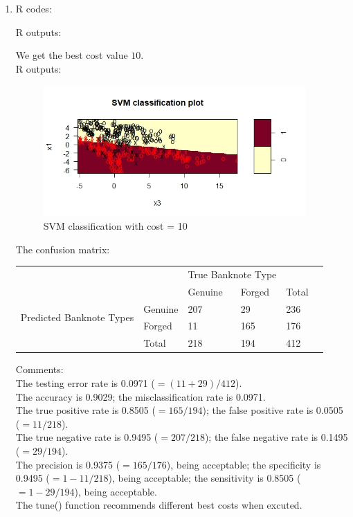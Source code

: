 \documentclass[10pt]{article}
\begin{document}
\begin{enumerate}[1)]
\item
R codes:

R outputs:

We get the best cost value $10$.\\
R outputs:
\begin{figure}[H]
  \centering
  \includegraphics[width=10cm,height=5cm]{p42a.jpeg}
  \caption{SVM classification with cost = 10}
\end{figure}

\vspace{3mm}
The confusion matrix:\\
\begin{tabular}{llllll}
                                          &         & \multicolumn{2}{l}{True Banknote Type} &       &  \\
                                          &         & Genuine           & Forged             & Total &  \\
\multirow{2}{*}{Predicted Banknote Types} & Genuine & 207               & 29                 & 236   &  \\
                                          & Forged  & 11                & 165                & 176   &  \\
                                          & Total   & 218               & 194                & 412   &
\end{tabular}
\vspace{3mm}

Comments:\\
The testing error rate is 0.0971 ($=(11+29)/412$).\\
The accuracy is 0.9029; the misclassification rate is 0.0971.\\
The true positive rate is 0.8505 ($=165/194$); the false positive rate is 0.0505 ($=11/218$).\\
The true negative rate is 0.9495 ($=207/218$); the false negative rate is 0.1495 ($=29/194$).\\
The precision is 0.9375 ($=165/176$), being acceptable; the specificity is 0.9495 ($=1-11/218$), being acceptable; the sensitivity is 0.8505 ($=1-29/194$), being acceptable.\\
The tune() function recommends different best costs when excuted.
\vspace{3mm}


\end{enumerate}
\end{document}
